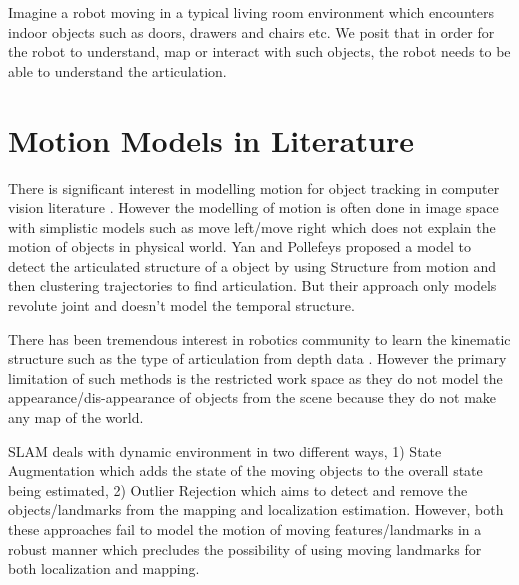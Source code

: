 \documentclass[10pt,twocolumn,letterpaper]{article}
\begin{document}
Imagine a robot moving in a typical living room environment which encounters indoor objects such as doors, drawers and chairs etc. We posit that in order for the robot to understand, map or interact with such objects, the robot needs to be able to understand the articulation. 

\section{Motion Models in Literature}
There is significant interest in modelling motion for object tracking in computer vision literature \cite{cifuentes2012motion}. However the modelling of motion is often done in image space with simplistic models such as move left/move right which does not explain the motion of objects in physical world. Yan and Pollefeys \cite{yan2006automatic} proposed a model to detect the articulated structure of a object by using Structure from motion and then clustering trajectories to find articulation. But their approach only models revolute joint and doesn't model the temporal structure. 

There has been tremendous interest in robotics community to learn the kinematic structure such as the type of articulation from depth data \cite{katz2014interactive}. However the primary limitation of such methods is the restricted work space as they do not model the appearance/dis-appearance of objects from the scene because they do not make any map of the world.

SLAM deals with dynamic environment in two different ways, 1) State Augmentation \cite{wang2003online,kundu2011realtime} which adds the state of the moving objects to the overall state being estimated, 2) Outlier Rejection which aims to detect and remove the objects/landmarks from the mapping and localization estimation. However, both these approaches fail to model the motion of moving features/landmarks in a robust manner which precludes the possibility of using moving landmarks for both localization and mapping. 
\end{document}
